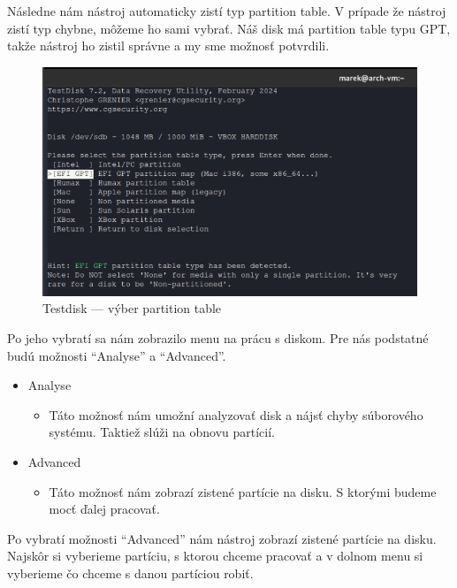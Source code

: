 \documentclass[12pt,oneside,slovak,a4paper]{article}
\begin{document}
Následne nám nástroj automaticky zistí typ partition table. V prípade že nástroj zistí typ chybne, môžeme ho sami vybrať. Náš disk má partition table typu GPT, takže nástroj ho zistil správne a my sme možnosť potvrdili.

\begin{figure}[H]
	\centering
	\includegraphics[scale=0.8]{./images/testdisk_testing/choose_partition_table.png}
	\centering
	\captionsetup{justification=centering,margin=2cm}
	\caption{Testdisk --- výber partition table}
\end{figure}

Po jeho vybratí sa nám zobrazilo menu na prácu s diskom. Pre nás podstatné budú možnosti ``Analyse'' a ``Advanced''.

\begin{spacing}{1.0}
	\begin{itemize}
		\item Analyse
			\begin{itemize}
				\item Táto možnosť nám umožní analyzovať disk a nájsť chyby súborového systému. Taktiež slúži na obnovu partícií.
			\end{itemize}
		\item Advanced
			\begin{itemize}
				\item Táto možnosť nám zobrazí zistené partície na disku. S ktorými budeme mocť ďalej pracovať.
			\end{itemize}
	\end{itemize}
\end{spacing}

Po vybratí možnosti ``Advanced'' nám nástroj zobrazí zistené partície na disku. Najskôr si vyberieme partíciu, s ktorou chceme pracovať a v dolnom menu si vyberieme čo chceme s danou partíciou robiť.
\end{document}

